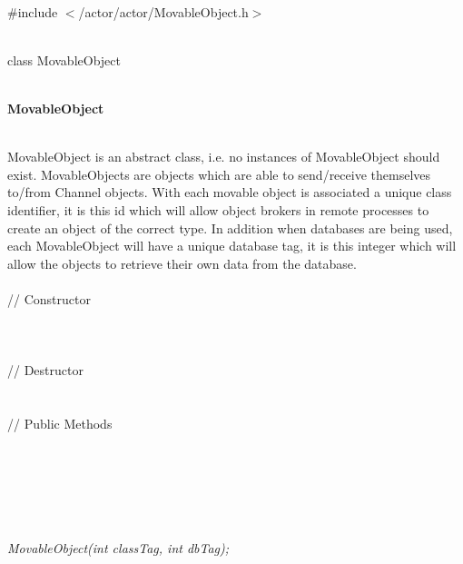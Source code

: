 
   \\
\#include $<$/actor/actor/MovableObject.h$>$  


  \\
class MovableObject 


 \\
{\bf MovableObject} 


  \\
\indent MovableObject is an abstract class, i.e. no instances of MovableObject
should exist. MovableObjects are objects which are able to
send/receive themselves to/from Channel objects. With each movable
object is associated a unique class identifier, it is this id which
will allow object brokers in remote processes to create an object of
the correct type. In addition when databases are being used, each
MovableObject will have a unique database tag, it is this integer
which will allow the objects to retrieve their own data from the database. \\ 


  \\
\indent\indent // Constructor  \\
\indent{}  \\
\indent{}  \\ \\
\indent\indent // Destructor \\
\indent{}\\  \\
\indent\indent // Public Methods  \\
\indent{}\\
\indent{}\\
\indent{}\\
\indent{} \\ 
\indent{} \\ 


  \\
{\em MovableObject(int classTag, int dbTag);}  

